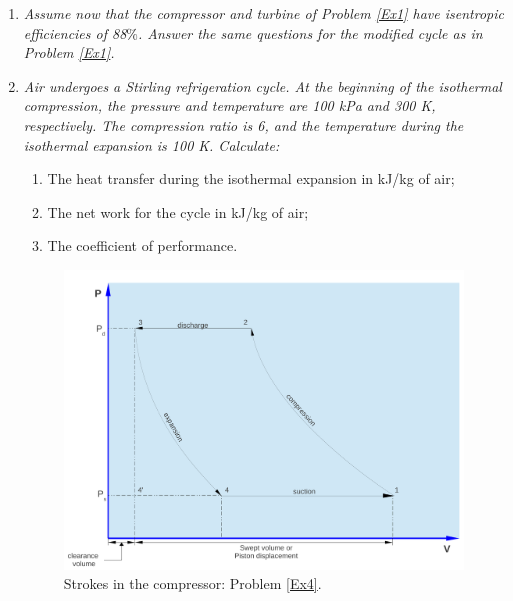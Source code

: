 \begin{enumerate}
The coefficient of performance (COP) is
\begin{displaymath}
\textcolor{red}{\text{COP}} = \frc{\text{Refrigerant Effect}}{\text{Work done}} = \frc{H_{b}-H_{4}}{\left(H_{2}-H_{1}\right)-\left(H_{3}-H_{4}\right)} = \frc{234.01 - 200.88}{(355.17-267.10)-(267.10-200.88)} = \textcolor{red}{1.516}
\end{displaymath}

\item \label{Ex2} {\it Assume now that the compressor and turbine of  Problem \ref{Ex1} have isentropic efficiencies of 88$\%$. Answer the same questions for the modified cycle as in Problem \ref{Ex1}.}


\item \label{Ex3}{\it  Air undergoes a Stirling refrigeration cycle. At the beginning of the isothermal compression, the pressure and temperature are 100 kPa and 300 K, respectively. The compression ratio is 6, and the temperature during the isothermal expansion is 100 K. Calculate:
\begin{enumerate}
\item The heat transfer during the isothermal expansion in kJ/kg of air;
\item The net work for the cycle in kJ/kg of air;
\item The coefficient of performance.
\end{enumerate}  
}

\begin{figure}[h]
 \begin{center}
  \includegraphics[width=12.cm,height=8.cm,clip]{./Pics/Overview_Refrig29}
  \end{center}
  \caption{Strokes in the compressor: Problem \ref{Ex4}.}\label{ex4_pic}
\end{figure}  



\end{enumerate}
